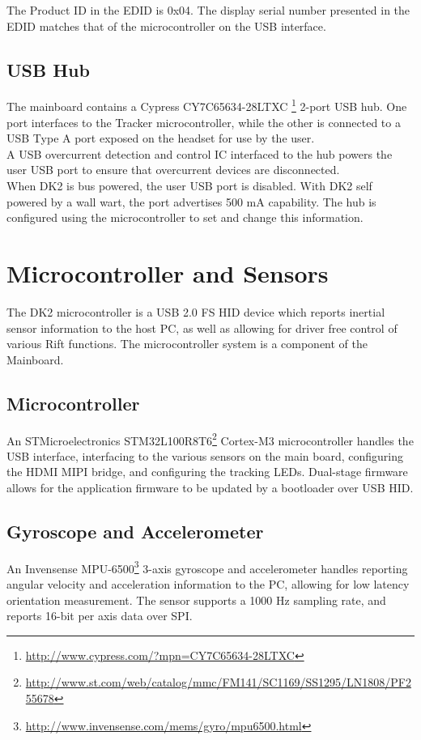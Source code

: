 \documentclass[letterpaper]{article}
\begin{document}
The Product ID in the EDID is 0x04.  The display serial number presented in the EDID matches that of the microcontroller on the USB interface.

\subsection{USB Hub}
The mainboard contains a Cypress CY7C65634-28LTXC \footnote{\url{http://www.cypress.com/?mpn=CY7C65634-28LTXC}} 2-port USB hub.  One port interfaces to the Tracker microcontroller, while the other is connected to a USB Type A port exposed on the headset for use by the user.\\

A USB overcurrent detection and control IC interfaced to the hub powers the user USB port to ensure that overcurrent devices are disconnected.\\

When DK2 is bus powered, the user USB port is disabled.  With DK2 self powered by a wall wart, the port advertises 500 mA capability.  The hub is configured using the microcontroller to set and change this information.

\newpage

\section{Microcontroller and Sensors}
The DK2 microcontroller is a USB 2.0 FS HID device which reports inertial sensor information to the host PC, as well as allowing for driver free control of various Rift functions.  The microcontroller system is a component of the Mainboard.

\subsection{Microcontroller}
An STMicroelectronics STM32L100R8T6\footnote{\url{http://www.st.com/web/catalog/mmc/FM141/SC1169/SS1295/LN1808/PF255678}} Cortex-M3 microcontroller handles the USB interface, interfacing to the various sensors on the main board, configuring the HDMI MIPI bridge, and configuring the tracking LEDs.  Dual-stage firmware allows for the application firmware to be updated by a bootloader over USB HID.

\subsection{Gyroscope and Accelerometer}
An Invensense MPU-6500\footnote{\url{http://www.invensense.com/mems/gyro/mpu6500.html}} 3-axis gyroscope and accelerometer handles reporting angular velocity and acceleration information to the PC, allowing for low latency orientation measurement.  The sensor supports a 1000 Hz sampling rate, and reports 16-bit per axis data over SPI.
\end{document}
